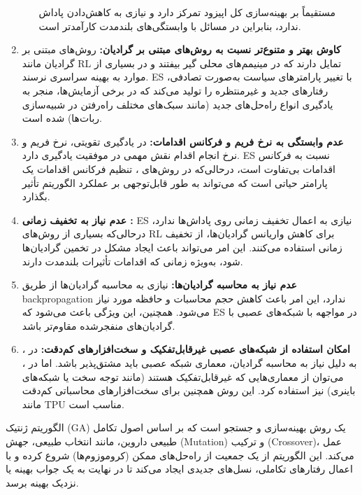 \documentclass[12pt]{exam}
\begin{document}
\begin{questions}
\begin{enumerate}
\begin{itemize}
				مستقیماً بر بهینه‌سازی کل اپیزود تمرکز دارد و نیازی به کاهش‌دادن پاداش ندارد، بنابراین در مسائل با وابستگی‌های بلندمدت کارآمدتر است.
				\end{itemize}
				\item \textbf{کاوش بهتر و متنوع‌تر نسبت به روش‌های مبتنی بر گرادیان: }
				روش‌های مبتنی بر گرادیان مانند RL تمایل دارند که در مینیمم‌های محلی گیر بیفتند و در بسیاری از موارد به بهینه سراسری نرسند. ES با تغییر پارامترهای سیاست به‌صورت تصادفی، رفتارهای جدید و غیرمنتظره را تولید می‌کند که در برخی آزمایش‌ها، منجر به یادگیری انواع راه‌حل‌های جدید (مانند سبک‌های مختلف راه‌رفتن در شبیه‌سازی ربات‌ها) شده است.
				\item \textbf{عدم وابستگی به نرخ فریم 
				و فرکانس اقدامات:}
				در یادگیری تقویتی، نرخ فریم و نرخ انجام اقدام نقش مهمی در موفقیت یادگیری دارد. ES  نسبت به فرکانس اقدامات 
				بی‌تفاوت است، درحالی‌که در روش‌های
				، تنظیم فرکانس اقدامات 
				یک پارامتر حیاتی است که می‌تواند به طور قابل‌توجهی بر عملکرد الگوریتم تأثیر بگذارد.
				\item\textbf{ عدم نیاز به تخفیف زمانی :}
				ES نیازی به اعمال تخفیف زمانی روی پاداش‌ها ندارد، درحالی‌که بسیاری از روش‌های RL برای کاهش واریانس گرادیان‌ها، از تخفیف زمانی استفاده می‌کنند. این امر می‌تواند باعث ایجاد مشکل در تخمین گرادیان‌ها شود، به‌ویژه زمانی که اقدامات تأثیرات بلندمدت دارند.
				\item \textbf{
				عدم نیاز به محاسبه گرادیان‌ها: 
				}
				نیازی به محاسبه گرادیان‌ها از طریق backpropagation ندارد، این امر باعث کاهش حجم محاسبات و حافظه مورد نیاز می‌شود. همچنین، این ویژگی باعث می‌شود که ES در مواجهه با شبکه‌های عصبی با گرادیان‌های منفجرشده
				 مقاوم‌تر باشد.
				\item \textbf{امکان استفاده از شبکه‌های عصبی غیرقابل‌تفکیک و سخت‌افزارهای کم‌دقت: }
				در
				،
				به دلیل نیاز به محاسبه گرادیان، معماری شبکه عصبی باید مشتق‌پذیر باشد. اما در
				،
				می‌توان از معماری‌هایی که غیرقابل‌تفکیک هستند (مانند توجه سخت یا شبکه‌های باینری) نیز استفاده کرد. این روش همچنین برای سخت‌افزارهای محاسباتی کم‌دقت مانند TPU مناسب است.
			\end{enumerate}
		\question الگوریتم ژنتیک (GA) یک روش بهینه‌سازی و جستجو است که بر اساس اصول تکامل طبیعی داروین، مانند انتخاب طبیعی، جهش (Mutation) و ترکیب (Crossover)، عمل می‌کند. این الگوریتم از یک جمعیت از راه‌حل‌های ممکن (کروموزوم‌ها) شروع کرده و با اعمال رفتارهای تکاملی، نسل‌های جدیدی ایجاد می‌کند تا در نهایت به یک جواب بهینه یا نزدیک بهینه برسد.

\end{questions}
\end{document}

